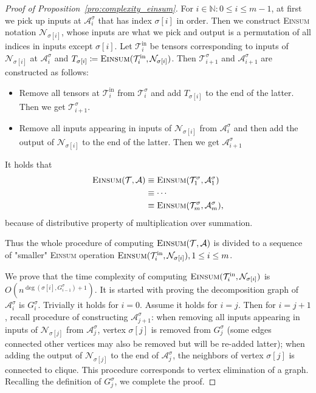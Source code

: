 \documentclass[12pt]{article}
\theoremstyle{plain}
\theoremstyle{definition}
\def\Einsum{\textsc{Einsum}}
\newcommand{\tensorcontraction}{\textsc{Einsum}}
\newcommand{\degp}[2]{\deg(#1,#2)}
\newcommand{\less}{O}
\newcommand{\naturals}{\mathbb{N}}
\def\calA{\mathcal{A}}
\def\calT{\mathcal{T}}
\def\calN{\mathcal{N}}
\begin{document}
\begin{bibunit}[agsm]
\begin{proof}[Proof of Proposition~\ref{pro:complexity_einsum}]
For $i \in \naturals: 0 \leq i \leq m-1$, at first we pick up inputs at $\calA^\sigma_i$ that has index $\sigma[i]$ in order. Then we construct \Einsum{} notation $\calN_{\sigma[i]}$, whose inputs are what we pick and output is a permutation of all indices in inputs except $\sigma[i]$. Let $\calT_i^{\mathrm{in}}$ be tensors corresponding to inputs of $\calN_{\sigma[i]}$ at $\calA^\sigma_i$ and $T_{\sigma[i]} \coloneqq \tensorcontraction(\calT_i^{\mathrm{in}}, \calN_{\sigma[i]})$. Then $\calT^\sigma_{i+1}$ and  $\calA^\sigma_{i+1}$ are constructed as follows:
\begin{itemize}
    \item Remove all tensors at $\calT_i^{\mathrm{in}}$ from $\calT^\sigma_i$ and add $T_{\sigma[i]}$ to the end of the latter. Then we get $\calT^\sigma_{i+1}$. 
    \item Remove all inputs appearing in inputs of $\calN_{\sigma[i]}$ from $\calA^\sigma_i$ and then add the output of $\calN_{\sigma[i]}$ to the end of the latter. Then we get $\calA^\sigma_{i+1}$
\end{itemize}

It holds that
\begin{align*}
    \tensorcontraction(\calT, \calA) & \equiv \tensorcontraction(\calT^\sigma_1, \calA^\sigma_1) \\
    & \equiv \cdots \\
    & \equiv \tensorcontraction(\calT^\sigma_m, \calA^\sigma_m),
\end{align*}
because of distributive property of multiplication over summation. 

Thus the whole procedure of computing $\tensorcontraction(\calT, \calA)$ is divided to a sequence of "smaller" \Einsum{} operation $\tensorcontraction(\calT_i^{\mathrm{in}}, \calN_{\sigma[i]}), 1 \leq i \leq m$. 

We prove that the time complexity of computing $\tensorcontraction(\calT_i^{\mathrm{in}},\calN_{\sigma[i]})$ is $\less(n^{\degp{\sigma[i]}{G^\sigma_{i-1}}+1})$. 
It is started with proving the decomposition graph of $\calA^\sigma_i$ is $G^\sigma_i$. Trivially it holds for $i=0$. Assume it holds for $i = j$. Then for $i=j+1$, recall procedure of constructing $\calA^\sigma_{j+1}$: when removing all inputs appearing in inputs of $\calN_{\sigma[j]}$ from $\calA^\sigma_j$, vertex $\sigma[j]$ is removed from $G^\sigma_j$ (some edges connected other vertices may also be removed but will be re-added latter); when adding the output of $\calN_{\sigma[j]}$ to the end of $\calA^\sigma_j$, the neighbors of vertex $\sigma[j]$ is connected to clique. This procedure corresponds to vertex elimination of a graph. Recalling the definition of $G^\sigma_j$, we complete the proof. 


\end{proof}
\end{bibunit}
\end{document}
